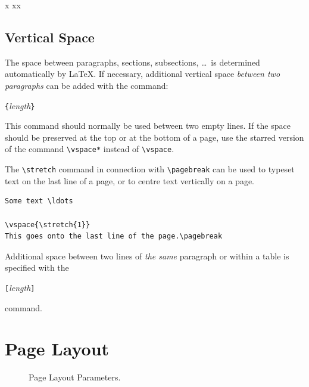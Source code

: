 \begin{example}
x
xx
\end{example}

\subsection{Vertical Space}
The space between paragraphs, sections, subsections, \ldots\ is
determined automatically by \LaTeX. If necessary, additional vertical
space \emph{between two paragraphs} can be added with the command:
\begin{command}
\verb|{|\emph{length}\verb|}|
\end{command}

This command should normally be used between two empty lines.  If the
space should be preserved at the top or at the bottom of a page, use
the starred version of the command \verb|\vspace*| instead of \verb|\vspace|.

The \verb|\stretch| command in connection with \verb|\pagebreak| can
be used to typeset text on the last line of a page, or to centre text
vertically on a page.
\begin{code}
\begin{verbatim}
Some text \ldots

\vspace{\stretch{1}}
This goes onto the last line of the page.\pagebreak
\end{verbatim}
\end{code}

Additional space between two lines of \emph{the same} paragraph or
within a table is specified with the
\begin{command}
\ci{\bs}\verb|[|\emph{length}\verb|]|
\end{command}
\noindent command. 

\section{Page Layout}

\begin{figure}[!hp]
\begin{center}
\makeatletter\@layout\makeatother
\end{center}
\vspace*{1.8cm}
\caption{Page Layout Parameters.}
\label{fig:layout}
\end{figure}

